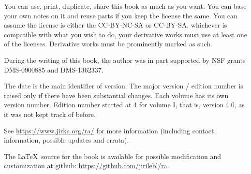 \documentclass[12pt]{book}
\theoremstyle{plain}
\theoremstyle{remark}
\theoremstyle{definition}
\theoremstyle{exercise}
\theoremstyle{example}
\begin{document}
\bigskip

\noindent
You can use, print, duplicate, share this book as much as you want.  You can
base your own notes on it and reuse parts if you keep the license the
same.  You can assume the license is either the CC-BY-NC-SA or CC-BY-SA\@,
whichever is compatible with what you wish to do, your derivative works must
use at least one of the licenses.
Derivative works must be prominently marked as such.

\bigskip

\noindent
During the writing of this book, 
the author was in part supported by NSF grants DMS-0900885 and
DMS-1362337.

\bigskip

\noindent
The date is the main identifier of version.  The major version / edition
number is raised only if there have been substantial changes.  Each
volume has its own version number.  Edition
number started at 4 for volume I, that is, version 4.0, as it was not kept track of
before.  %

\bigskip

\noindent
See \url{https://www.jirka.org/ra/} for more information
(including contact information, possible updates and errata).

\bigskip

\noindent
The \LaTeX\ source for the book is available
for possible modification and customization
at github: \url{https://github.com/jirilebl/ra}



\tableofcontents
{}

\newpage




\newcommand{\VolOneIntroExtrahead}{
\subsection{About Volume I}
}

\newcommand{\VolTwoIntro}{
\subsection{About Volume II}


}
\end{document}
